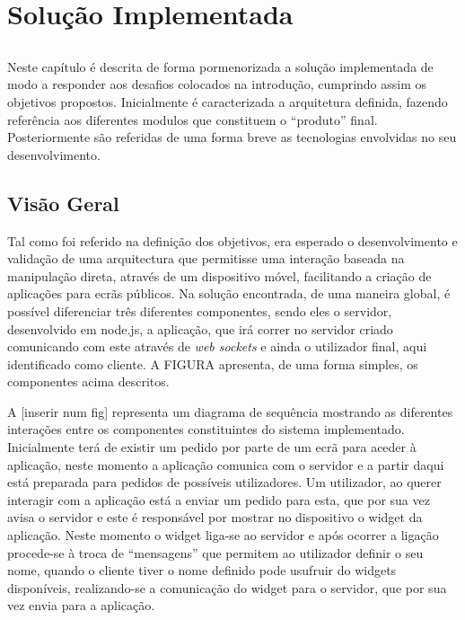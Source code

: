 \chapter{Solução Implementada} \label{chap:sol}

\section*{}

Neste capítulo é descrita de forma pormenorizada a solução implementada de modo a responder aos desafios colocados na introdução, cumprindo assim os objetivos propostos.
Inicialmente é caracterizada a arquitetura definida, fazendo referência aos diferentes modulos que constituem o “produto” final. Posteriormente são referidas de uma forma breve as tecnologias envolvidas no seu desenvolvimento.


\section{Visão Geral} \label{sec:geral}

Tal como foi referido na definição dos objetivos, era esperado o desenvolvimento e validação de uma arquitectura que permitisse uma interação baseada na manipulação direta, através de um dispositivo móvel, facilitando a criação de aplicações para ecrãs públicos.  
Na solução encontrada, de uma maneira global, é possível diferenciar três diferentes componentes, sendo eles o servidor, desenvolvido em node.js, a aplicação, que irá correr no servidor criado comunicando com este através de \textit{web sockets} e ainda o utilizador final, aqui identificado como cliente.
A FIGURA apresenta, de uma forma simples, os componentes acima descritos.

A [inserir num fig] representa um diagrama de sequência mostrando as diferentes interações entre os componentes constituintes do sistema implementado. Inicialmente terá de existir um pedido por parte de um ecrã para aceder à aplicação, neste momento a aplicação comunica com o servidor e a partir daqui está preparada para pedidos de possíveis utilizadores. Um utilizador, ao querer interagir com a aplicação está a enviar um pedido para esta, que por sua vez avisa o servidor e este é responsável por mostrar no dispositivo o widget da aplicação. Neste momento o widget liga-se ao servidor e após ocorrer a ligação procede-se à troca de “mensagens” que permitem ao utilizador definir o seu nome, quando o cliente tiver o nome definido pode usufruir do widgets disponíveis, realizando-se a comunicação do  widget para o servidor, que por sua vez envia para a aplicação.

